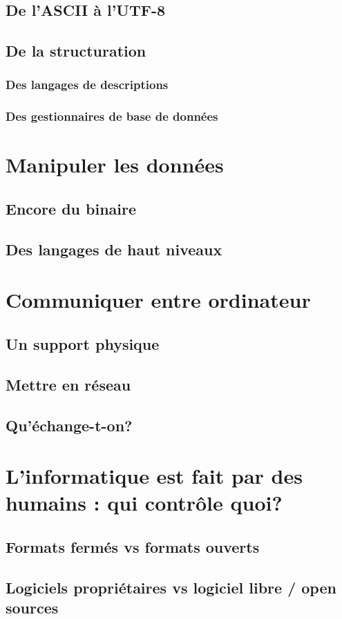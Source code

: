 \documentclass{beamer}
\begin{document}
\subsection{De l'ASCII à l'UTF-8}
\subsection{De la structuration}
\subsubsection{Des langages de descriptions}
\subsubsection{Des gestionnaires de base de données}

\section{Manipuler les données}
\subsection{Encore du binaire}
\subsection{Des langages de haut niveaux}

\section{Communiquer entre ordinateur} %
\subsection{Un support physique}%
\subsection{Mettre en réseau}%
\subsection{Qu'échange-t-on?}%

\section{L'informatique est fait par des humains : qui contrôle quoi?}
\subsection{Formats fermés vs formats ouverts}
\subsection{Logiciels propriétaires vs logiciel libre / open sources} %
\end{document}
